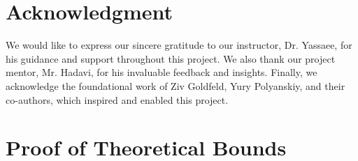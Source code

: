 \documentclass[conference]{IEEEtran}
\begin{document}
\section*{Acknowledgment}
We would like to express our sincere gratitude to our instructor, Dr. Yassaee, for his guidance and support throughout this project. We also thank our project mentor, Mr. Hadavi, for his invaluable feedback and insights. Finally, we acknowledge the foundational work of Ziv Goldfeld, Yury Polyanskiy, and their co-authors, which inspired and enabled this project.





\clearpage

\appendices
\section{Proof of Theoretical Bounds}
\end{document}

